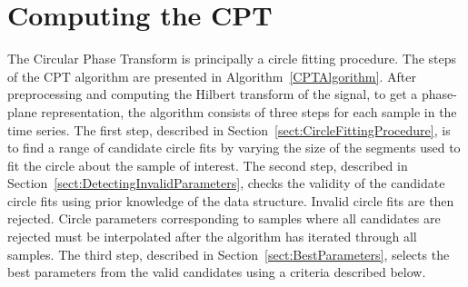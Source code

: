 \documentclass[journal,11pt,a4paper,onecolumn,draftcls]{IEEEtran}
\begin{document}
\section{Computing the CPT}\label{sect:ComputingCPTSection}

The Circular Phase Transform is principally a circle fitting procedure. The steps of the CPT algorithm are presented in Algorithm~\ref{CPTAlgorithm}. After preprocessing and computing the Hilbert transform of the signal, to get a phase-plane representation, the algorithm consists of three steps for each sample in the time series. The first step, described in Section~\ref{sect:CircleFittingProcedure}, is to find a range of candidate circle fits by varying the size of the segments used to fit the circle about the sample of interest. The second step, described in Section~\ref{sect:DetectingInvalidParameters}, checks the validity of the candidate circle fits using prior knowledge of the data structure. Invalid circle fits are then rejected. Circle parameters corresponding to samples where all candidates are rejected must be interpolated after the algorithm has iterated through all samples. The third step, described in Section~\ref{sect:BestParameters}, selects the best parameters from the valid candidates using a criteria described below. 

\end{document}
